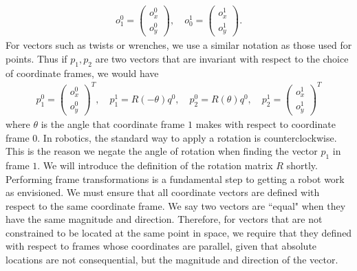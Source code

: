 %
\begin{align}
o^0_1 = \left( \begin{array}{c}
o^0_x \\ o^0_y
\end{array}
\right), \quad
%
o^1_0 = \left( \begin{array}{c}
o^1_x \\ o^1_y
\end{array}
\right).
\end{align}
%
For vectors such as twists or wrenches, we use a similar notation as those used for points. Thus if $p_1, p_2$ are two vectors that are invariant with respect to the choice of coordinate frames, we would have
%
\begin{align}
p^0_1 = \left( \begin{array}{c}
o^0_x \\  o^0_y
\end{array}
\right)^T,
%
\quad p^1_1 = R(-\theta) q^0, 
%
\quad p^0_2 = R(\theta) q^0, \quad p^1_2 = \left( \begin{array}{c}
o^1_x \\  o^1_y
\end{array}
\right)^T
\end{align}
%
where $\theta$ is the angle that coordinate frame $1$ makes with respect to coordinate frame $0$. In robotics, the standard way to apply a rotation is counterclockwise. This is the reason we negate the angle of rotation when finding the vector $p_1$ in frame $1$. We will introduce the definition of the rotation matrix $R$ shortly. Performing frame transformations is a fundamental step to getting a robot work as envisioned. We must ensure that all coordinate vectors are defined with respect to the same coordinate frame. We say two vectors are ``equal" when they have the same magnitude and direction. Therefore, for vectors that are not constrained to be located at the same point in space, we require that they defined with respect to frames whose coordinates are parallel, given that absolute locations are not consequential, but the magnitude and direction of the vector.

